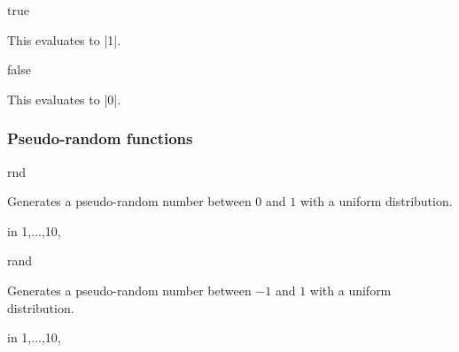 \begin{math-function}{true}
\mathcommand

	This evaluates to |1|.
	
\begin{codeexample}[]
 \pgfmathresult
\end{codeexample}

\end{math-function}

\begin{math-function}{false}
\mathcommand

	This evaluates to |0|.
	
\begin{codeexample}[]
 \pgfmathresult
\end{codeexample}

\end{math-function}



\subsubsection{Pseudo-random functions}

\label{pgfmath-functions-random}

\begin{math-function}{rnd}
\mathcommand

	Generates a pseudo-random number between $0$ and $1$ with a uniform distribution.

\begin{codeexample}[]
\foreach \x in {1,...,10}{\pgfmathresult, }
\end{codeexample}

\end{math-function}

\begin{math-function}{rand}
\mathcommand

	Generates a pseudo-random number between $-1$ and $1$ with a uniform distribution.

\begin{codeexample}[]
\foreach \x in {1,...,10}{\pgfmathresult, }
\end{codeexample}

\end{math-function}


